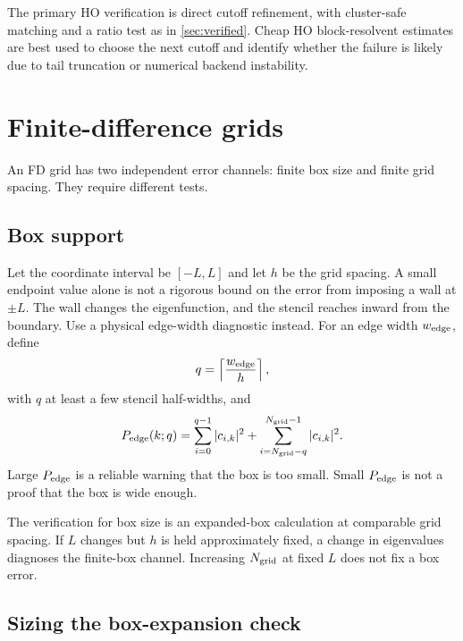 \documentclass[11pt,a4paper]{article}
\newcommand{\Pedge}{P_{\rm edge}}
\begin{document}
The primary HO verification is direct cutoff refinement, with cluster-safe matching and a ratio test as in \cref{sec:verified}.  Cheap HO block-resolvent estimates are best used to choose the next cutoff and identify whether the failure is likely due to tail truncation or numerical backend instability.

\section{Finite-difference grids}
\label{sec:fd}

An FD grid has two independent error channels: finite box size and finite grid spacing.  They require different tests.

\subsection{Box support}

Let the coordinate interval be $[-L,L]$ and let $h$ be the grid spacing.  A small endpoint value alone is not a rigorous bound on the error from imposing a wall at $\pm L$.  The wall changes the eigenfunction, and the stencil reaches inward from the boundary.  Use a physical edge-width diagnostic instead.  For an edge width $w_{\rm edge}$, define
\begin{equation}
  q=\left\lceil\frac{w_{\rm edge}}{h}\right\rceil,
\end{equation}
with $q$ at least a few stencil half-widths, and
\begin{equation}
  \Pedge(k;q)=\sum_{i=0}^{q-1}|c_{i,k}|^2+
  \sum_{i=N_{\rm grid}-q}^{N_{\rm grid}-1}|c_{i,k}|^2.
\end{equation}
Large $\Pedge$ is a reliable warning that the box is too small.  Small $\Pedge$ is not a proof that the box is wide enough.

The verification for box size is an expanded-box calculation at comparable grid spacing.  If $L$ changes but $h$ is held approximately fixed, a change in eigenvalues diagnoses the finite-box channel.  Increasing $N_{\rm grid}$ at fixed $L$ does not fix a box error.

\subsection{Sizing the box-expansion check}
\end{document}
